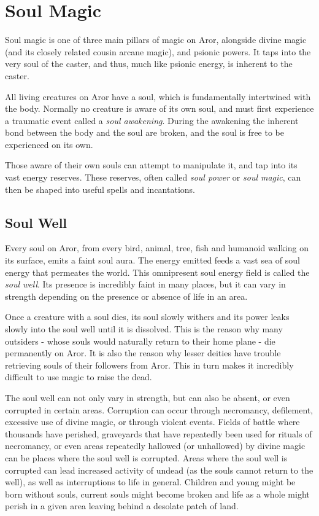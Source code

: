 \section{Soul Magic}
\label{sec:Soul Magic}

Soul magic is one of three main pillars of magic on Aror, alongside divine
magic (and its closely related cousin arcane magic), and psionic
powers. It taps into the very soul of the caster, and thus, much like psionic
energy, is inherent to the caster.

All living creatures on Aror have a soul, which is fundamentally intertwined
with the body. Normally no creature is aware of its own soul, and must first
experience a traumatic event called a \emph{soul awakening}. During the
awakening the inherent bond between the body and the soul are broken, and the
soul is free to be experienced on its own.

Those aware of their own souls can attempt to manipulate it, and tap into
its vast energy reserves. These reserves, often called \emph{soul power} or
\emph{soul magic}, can then be shaped into useful spells and incantations.

\subsection{Soul Well}
\label{sec:Soul Well}

Every soul on Aror, from every bird, animal, tree, fish and humanoid walking
on its surface, emits a faint soul aura. The energy emitted feeds a vast sea
of soul energy that permeates the world. This omnipresent soul energy field is
called the \emph{soul well}. Its presence is incredibly faint in many places,
but it can vary in strength depending on the presence or absence of life in an
area.

Once a creature with a soul dies, its soul slowly withers and its power leaks
slowly into the soul well until it is dissolved. This is the reason why
many outsiders - whose souls would naturally return to their home plane - die
permanently on Aror. It is also the reason why lesser deities have trouble
retrieving souls of their followers from Aror. This in turn makes it incredibly
difficult to use magic to raise the dead.

The soul well can not only vary in strength, but can also be absent, or 
even corrupted in certain areas. Corruption can occur through necromancy, 
defilement, excessive use of divine magic, or through violent events. 
Fields of battle where thousands have perished, graveyards that have 
repeatedly been used for rituals of necromancy, or even areas repeatedly 
hallowed (or unhallowed) by divine magic can be places where the soul well 
is corrupted. Areas where the soul well is corrupted can lead increased 
activity of undead (as the souls cannot return to the well), as well as 
interruptions to life in general. Children and young might be born without 
souls, current souls might become broken and life as a whole might perish 
in a given area leaving behind a desolate patch of land.

